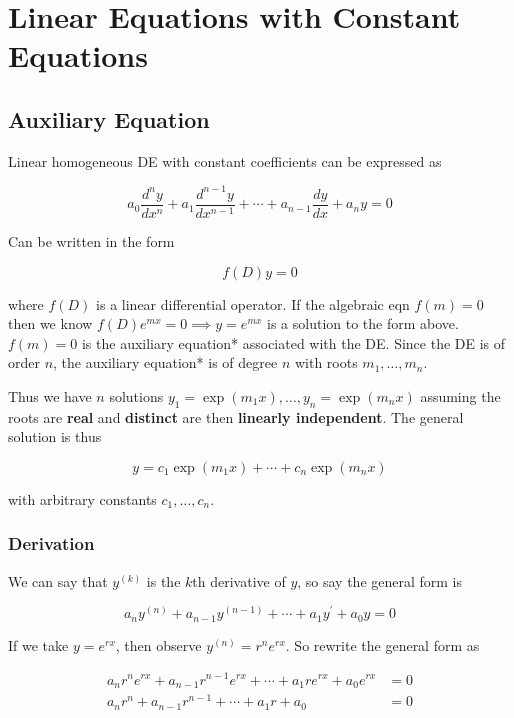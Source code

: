 \section{Linear Equations with Constant Equations}

\subsection{Auxiliary Equation}

Linear homogeneous DE with constant coefficients can be expressed as

\begin{equation*}
    a_{0} \frac{d^{n} y}{d x^{n}}+a_{1} \frac{d^{n-1} y}{d x^{n-1}}+\cdots+a_{n-1} \frac{d y}{d x}+a_{n} y=0
\end{equation*}

Can be written in the form

\begin{equation*}
    f(D)y=0
\end{equation*}

where $f(D)$ is a linear differential operator. If the algebraic eqn $f(m)=0$
then we know $f(D)e^{mx}=0\implies y=e^{mx}$ is a solution to the form above.
$f(m)=0$ is the auxiliary equation* associated with the DE.
Since the DE is of order $n$, the auxiliary equation* is of degree $n$ with
roots $m_1,\ldots,m_n$.

Thus we have $n$ solutions $y_1=\exp(m_1x),\ldots,y_n=\exp(m_nx)$ assuming
the roots are \textbf{real} and \textbf{distinct} are then \textbf{linearly independent}.
The general solution is thus

\begin{equation*}
    y=c_1\exp(m_1x)+\cdots+c_n\exp(m_nx)
\end{equation*}

with arbitrary constants $c_1,\ldots,c_n$.

\subsubsection{Derivation}

We can say that $y^{(k)}$ is the $k$th derivative of $y$, so say the general form is

$$
a_ny^{(n)}+a_{n-1}y^{(n-1)}+\cdots+a_1y^\prime +a_0y=0
$$

If we take $y=e^{rx}$, then observe $y^{(n)}=r^ne^{rx}$. So rewrite the general form as

\begin{align*}
    a_nr^ne^{rx}+a_{n-1}r^{n-1}e^{rx}+\cdots+a_1re^{rx}+a_0e^{rx}&=0\\
    a_nr^n+a_{n-1}r^{n-1}+\cdots+a_1r+a_0&=0
\end{align*}

